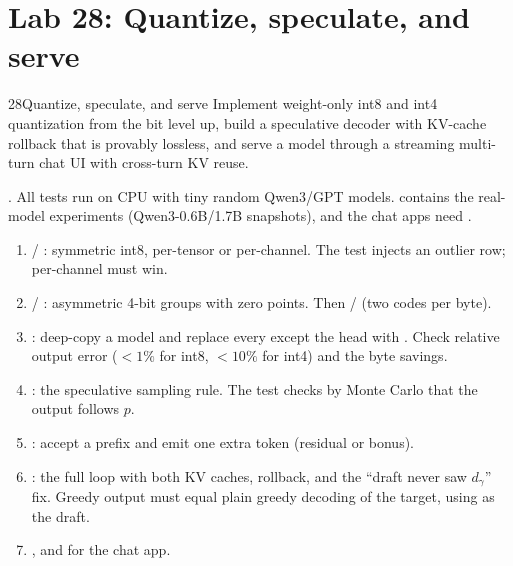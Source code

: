 \section{Lab 28: Quantize, speculate, and serve}\label{sec:efficient:lab}
\begin{labbox}{28}{Quantize, speculate, and serve}
Implement weight-only int8 and int4 quantization from the bit level up, build a
speculative decoder with KV-cache rollback that is provably lossless, and serve a model
through a streaming multi-turn chat UI with cross-turn KV reuse.

. All
tests run on CPU with tiny random Qwen3/GPT models.  contains the
real-model experiments (Qwen3-0.6B/1.7B snapshots), and the chat apps need
.

\begin{enumerate}
  \item {} / : symmetric int8, per-tensor or
        per-channel. The test injects an outlier row; per-channel must win.
  \item {} / : asymmetric 4-bit groups
        with zero points. Then  /  (two codes per byte).
  \item {}: deep-copy a model and replace every
         except the head with . Check relative
        output error ($<1\%$ for int8, $<10\%$ for int4) and the byte savings.
  \item {}: the speculative sampling rule. The test checks by
        Monte Carlo that the output follows $p$.
  \item {}: accept a prefix and emit one extra token (residual or bonus).
  \item {}: the full loop with both KV caches, rollback, and
        the ``draft never saw $d_\gamma$'' fix. Greedy output must equal plain greedy
        decoding of the target, using  as the draft.
  \item {}, and  for the chat app.
\end{enumerate}


\end{labbox}
